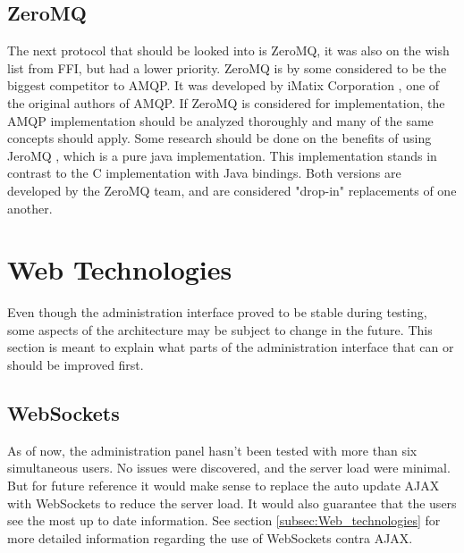 \subsection{ZeroMQ}
The next protocol that should be looked into is ZeroMQ, it was also on the wish list from FFI, but had a lower priority. ZeroMQ is by some considered to be the biggest competitor to AMQP. It was developed by iMatix Corporation \cite{imatix}, one of the original authors of AMQP. If ZeroMQ is considered for implementation, the AMQP implementation should be analyzed thoroughly and many of the same concepts should apply. Some research should be done on the benefits of using JeroMQ \cite{jero-mq}, which is a pure java implementation. This implementation stands in contrast to the C implementation with Java bindings. Both versions are developed by the ZeroMQ team, and are considered "drop-in" replacements of one another.

\section{Web Technologies}
Even though the administration interface proved to be stable during testing, some aspects of the architecture may be subject to change in the future. This section is meant to explain what parts of the administration interface that can or should be improved first. 

\subsection{WebSockets}
As of now, the administration panel hasn't been tested with more than six simultaneous users. No issues were discovered, and the server load were minimal. But for future reference it would make sense to replace the auto update AJAX with WebSockets to reduce the server load. It would also guarantee that the users see the most up to date information. See section \ref{subsec:Web_technologies} for more detailed information regarding the use of WebSockets contra AJAX.

\clearpage
